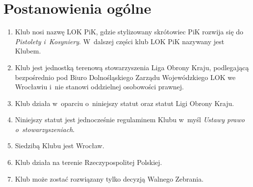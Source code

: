 \section{Postanowienia ogólne}
\begin{enumerate}
    \item Klub nosi nazwę LOK PiK, gdzie stylizowany skrótowiec PiK rozwija się do \textit{Pistolety i~Kosyniery}. W~dalszej części klub LOK PiK nazywany jest Klubem.
    \item Klub jest jednostką terenową stowarzyszenia Liga Obrony Kraju, podlegającą bezpośrednio pod Biuro Dolnośląskiego Zarządu Wojewódzkiego LOK we Wrocławiu i~nie stanowi oddzielnej osobowości prawnej.
    \item Klub działa w~oparciu o~niniejszy statut oraz statut Ligi Obrony Kraju.
    \item Niniejszy statut jest jednocześnie regulaminem Klubu w~myśl \textit{Ustawy prawo o~stowarzyszeniach}.
    \item Siedzibą Klubu jest Wrocław.
    \item Klub działa na terenie Rzeczypospolitej Polskiej.
    \item Klub może zostać rozwiązany tylko decyzją Walnego Zebrania.
\end{enumerate}